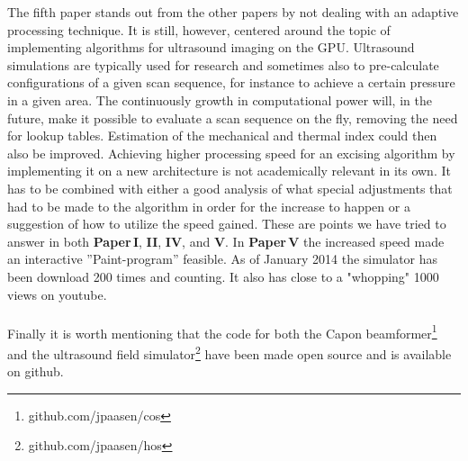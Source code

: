 The fifth paper stands out from the other papers by not dealing with an adaptive processing technique. It is still, however, centered around the topic of implementing algorithms for ultrasound imaging on the GPU. Ultrasound simulations are typically used for research and sometimes also to pre-calculate configurations of a given scan sequence, for instance to achieve a certain pressure in a given area. The continuously growth in computational power will, in the future, make it possible to evaluate a scan sequence on the fly, removing the need for lookup tables. Estimation of the mechanical and thermal index could then also be improved. Achieving higher processing speed for an excising algorithm by implementing it on a new architecture is not academically relevant in its own. It has to be combined with either a good analysis of what special adjustments that had to be made to the algorithm in order for the increase to happen or a suggestion of how to utilize the speed gained. These are points we have tried to answer in both \textbf{Paper\,I}, \textbf{II},  \textbf{IV}, and \textbf{V}.  In \textbf{Paper\,V} the increased speed made an interactive ''Paint-program'' feasible. As of January 2014 the simulator has been download 200 times and counting. It also has close to a "whopping" 1000 views on youtube. 
\\\\
Finally it is worth mentioning that the code for both the Capon beamformer\footnote{github.com/jpaasen/cos} and the ultrasound field simulator\footnote{github.com/jpaasen/hos} have been made open source and is available on github. 
\endinput